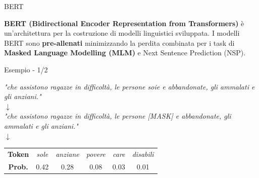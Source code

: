 \documentclass{beamer}
\begin{document}
\begin{frame}{BERT}
	
\textbf{BERT (Bidirectional Encoder Representation from Transformers)} è un'architettura per la costruzione di modelli linguistici sviluppata.
\newline \newline
I modelli BERT sono \textbf{pre-allenati} minimizzando la perdita combinata per i task di \textbf{Masked Language Modelling (MLM)} e Next Sentence Prediction (NSP).
	
\end{frame}



\begin{frame}{Esempio - 1/2}

\begin{center}
\textit{"che assistono ragazze in difficoltà, le persone {\color{rossoPantano} soie} e abbandonate, gli ammalati e gli anziani."}\\
$\downarrow$\\
\textit{"che assistono ragazze in difficoltà, le persone {\color{rossoPantano}[MASK]}  e abbandonate, gli ammalati e gli anziani."}\\
$\downarrow$\\
\begin{tabular}{c|ccccc}
\textbf{Token} & \textit{sole} & \textit{anziane} & \textit{povere} & \textit{care} & \textit{disabili}\\
\textbf{Prob.} & 0.42 & 0.28 & 0.08 & 0.03 & 0.01 \\
\end{tabular}
\end{center}
\end{frame}
\end{document}
